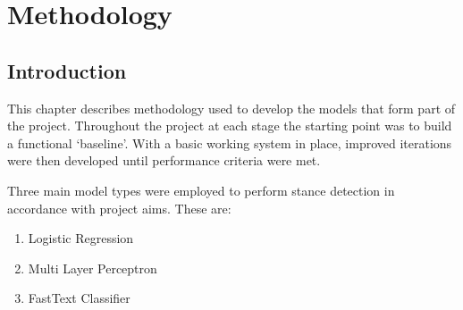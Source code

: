 \documentclass[Dissertation.tex]{subfiles}
\begin{document}
\chapter{Methodology}\label{chap:method}
\section{Introduction}\label{sec:methInt}
This chapter describes methodology used to develop the models that form part of the project. Throughout the project at each stage the starting point was to build a functional `baseline'. With a basic working system in place, improved iterations were then developed until performance criteria were met.

Three main model types were employed to perform stance detection in accordance with project aims. These are:
\begin{enumerate}
	\item Logistic Regression 
	\item Multi Layer Perceptron
	\item FastText Classifier
\end{enumerate}
\end{document}
